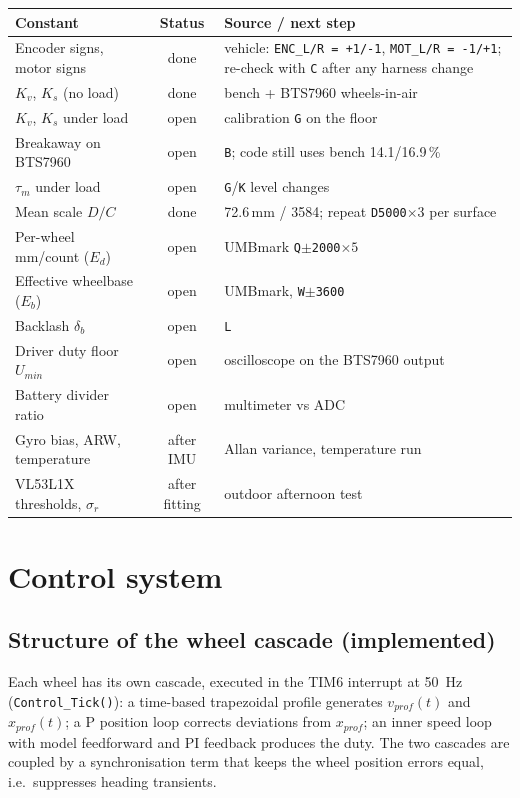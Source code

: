\documentclass[11pt,a4paper]{article}
\newcommand{\tg}[1]{{\small\textcolor{good}{\textsf{#1}}}}
\newcommand{\tw}[1]{{\small\textcolor{warn}{\textsf{#1}}}}
\newcommand{\tk}[1]{{\small\textcolor{cold}{\textsf{#1}}}}
\newcommand{\code}[1]{\texttt{\small #1}}
\begin{document}
\begin{center}
\small
\begin{tabularx}{\textwidth}{@{}lcL@{}}
\toprule
\textbf{Constant} & \textbf{Status} & \textbf{Source / next step}\\
\midrule
Encoder signs, motor signs & \tg{done} & vehicle: \code{ENC\_L/R = +1/-1}, \code{MOT\_L/R = -1/+1}; re-check with \code{C} after any harness change\\
$K_v$, $K_s$ (no load) & \tg{done} & bench + BTS7960 wheels-in-air\\
$K_v$, $K_s$ under load & \tw{open} & calibration \code{G} on the floor\\
Breakaway on BTS7960 & \tw{open} & \code{B}; code still uses bench 14.1/16.9\,\%\\
$\tau_m$ under load & \tw{open} & \code{G}/\code{K} level changes\\
Mean scale $D/C$ & \tg{done} & 72.6\,mm / 3584; repeat \code{D5000}$\times3$ per surface\\
Per-wheel mm/count ($E_d$) & \tw{open} & UMBmark \code{Q$\pm$2000}$\times5$\\
Effective wheelbase ($E_b$) & \tw{open} & UMBmark, \code{W$\pm$3600}\\
Backlash $\delta_b$ & \tw{open} & \code{L}\\
Driver duty floor $U_{min}$ & \tw{open} & oscilloscope on the BTS7960 output\\
Battery divider ratio & \tw{open} & multimeter vs ADC\\
Gyro bias, ARW, temperature & \tk{after IMU} & Allan variance, temperature run\\
VL53L1X thresholds, $\sigma_r$ & \tk{after fitting} & outdoor afternoon test\\
\bottomrule
\end{tabularx}
\end{center}
\clearpage
\section{Control system}\label{sec:control}

\subsection{Structure of the wheel cascade (implemented)}\label{sec:cascade}

Each wheel has its own cascade, executed in the TIM6 interrupt at \qty{50}{Hz}
(\code{Control\_Tick()}): a time-based trapezoidal profile generates
$v_{prof}(t)$ and $x_{prof}(t)$; a P position loop corrects deviations from
$x_{prof}$; an inner speed loop with model feedforward and PI feedback produces the
duty. The two cascades are coupled by a synchronisation term that keeps the
wheel position errors equal, i.e.\ suppresses heading transients.
\end{document}
